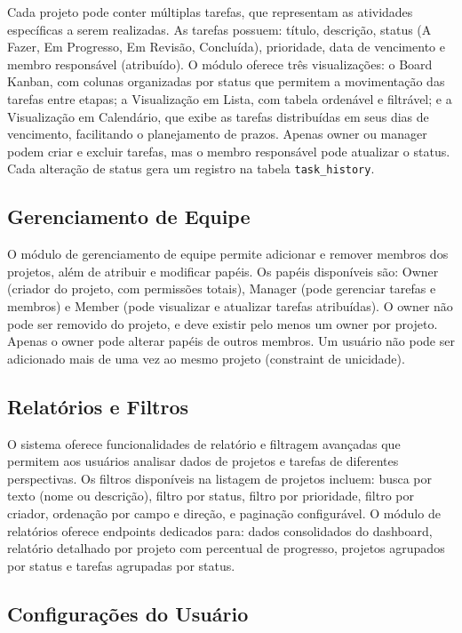 \documentclass[a4paper,12pt,oneside]{article}
\begin{document}
Cada projeto pode conter múltiplas tarefas, que representam as atividades específicas a serem realizadas. As tarefas possuem: título, descrição, status (A Fazer, Em Progresso, Em Revisão, Concluída), prioridade, data de vencimento e membro responsável (atribuído). O módulo oferece três visualizações: o Board Kanban, com colunas organizadas por status que permitem a movimentação das tarefas entre etapas; a Visualização em Lista, com tabela ordenável e filtrável; e a Visualização em Calendário, que exibe as tarefas distribuídas em seus dias de vencimento, facilitando o planejamento de prazos. Apenas owner ou manager podem criar e excluir tarefas, mas o membro responsável pode atualizar o status. Cada alteração de status gera um registro na tabela \texttt{task\_history}.

\subsection{Gerenciamento de Equipe}

O módulo de gerenciamento de equipe permite adicionar e remover membros dos projetos, além de atribuir e modificar papéis. Os papéis disponíveis são: Owner (criador do projeto, com permissões totais), Manager (pode gerenciar tarefas e membros) e Member (pode visualizar e atualizar tarefas atribuídas). O owner não pode ser removido do projeto, e deve existir pelo menos um owner por projeto. Apenas o owner pode alterar papéis de outros membros. Um usuário não pode ser adicionado mais de uma vez ao mesmo projeto (constraint de unicidade).

\subsection{Relatórios e Filtros}

O sistema oferece funcionalidades de relatório e filtragem avançadas que permitem aos usuários analisar dados de projetos e tarefas de diferentes perspectivas. Os filtros disponíveis na listagem de projetos incluem: busca por texto (nome ou descrição), filtro por status, filtro por prioridade, filtro por criador, ordenação por campo e direção, e paginação configurável. O módulo de relatórios oferece endpoints dedicados para: dados consolidados do dashboard, relatório detalhado por projeto com percentual de progresso, projetos agrupados por status e tarefas agrupadas por status.

\subsection{Configurações do Usuário}
\end{document}
